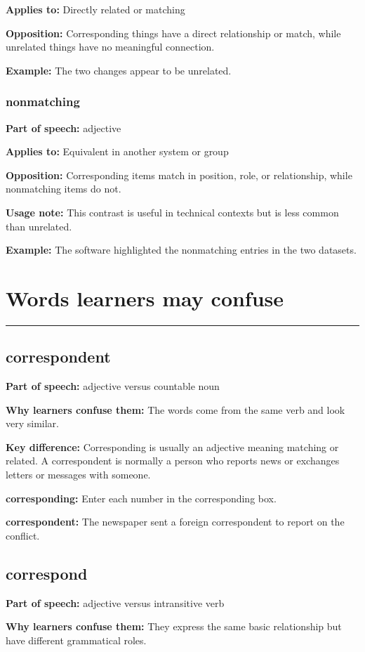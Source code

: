 \documentclass[11pt]{article}
\newcommand{\sectionrule}{\par\vspace{-0.5em}\noindent\textcolor{Accent}{\rule{\linewidth}{0.6pt}}\par}
\begin{document}
\textbf{Applies to:} Directly related or matching

\textbf{Opposition:} Corresponding things have a direct relationship or match, while unrelated things have no meaningful connection.

\textbf{Example:} The two changes appear to be unrelated.

\subsubsection{nonmatching}
\textbf{Part of speech:} adjective

\textbf{Applies to:} Equivalent in another system or group

\textbf{Opposition:} Corresponding items match in position, role, or relationship, while nonmatching items do not.

\textbf{Usage note:} This contrast is useful in technical contexts but is less common than unrelated.

\textbf{Example:} The software highlighted the nonmatching entries in the two datasets.

\section{Words learners may confuse}
\sectionrule
\subsection{correspondent}
\textbf{Part of speech:} adjective versus countable noun

\textbf{Why learners confuse them:} The words come from the same verb and look very similar.

\textbf{Key difference:} Corresponding is usually an adjective meaning matching or related. A correspondent is normally a person who reports news or exchanges letters or messages with someone.

\textbf{corresponding:} Enter each number in the corresponding box.

\textbf{correspondent:} The newspaper sent a foreign correspondent to report on the conflict.

\subsection{correspond}
\textbf{Part of speech:} adjective versus intransitive verb

\textbf{Why learners confuse them:} They express the same basic relationship but have different grammatical roles.
\end{document}
